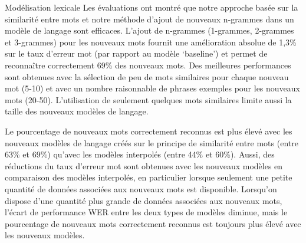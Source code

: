 \documentclass{style/these}
\begin{document}
\begin{part}{Modélisation lexicale}
Les évaluations ont montré que notre approche basée sur la similarité entre mots et notre méthode d'ajout de nouveaux n-grammes dans un modèle de langage sont efficaces.  
L'ajout de n-grammes (1-grammes, 2-grammes et 3-grammes) pour les nouveaux mots fournit une amélioration absolue de 1,3\% sur le taux d'erreur mot (par rapport au modèle `baseline') et permet de reconnaître correctement 69\% des nouveaux mots. 
Des meilleures performances sont obtenues avec la sélection de peu de mots similaires pour chaque nouveau mot (5-10) et avec un nombre raisonnable de phrases exemples pour les nouveaux mots (20-50). L'utilisation de seulement quelques mots similaires limite aussi la taille des nouveaux modèles de langage.

Le pourcentage de nouveaux mots correctement reconnus est plus élevé avec les nouveaux modèles de langage créés sur le principe de similarité entre mots (entre 63\% et 69\%) qu'avec les modèles interpolés (entre 44\% et 60\%). 
Aussi, des réductions du taux d'erreur mot sont obtenues avec les nouveaux modèles en comparaison des modèles interpolés, en particulier lorsque seulement une petite quantité de données associées aux nouveaux mots est disponible. Lorsqu'on dispose d'une quantité plus grande de données associées aux nouveaux mots, l'écart de performance \acrshort{WER} entre les deux types de modèles diminue, mais le pourcentage de nouveaux mots correctement reconnus est toujours plus élevé avec les nouveaux modèles.

\stopcontents[parts]
\end{part}


\renewcommand{\leftmark}{}
\renewcommand{\rightmark}{}
\end{document}
